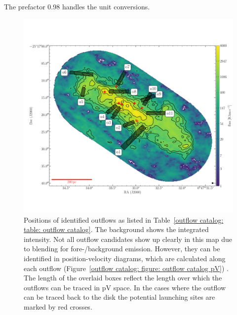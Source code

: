 The prefactor 0.98 handles the unit conversions.

\begin{figure}[t]
	\centering
	\includegraphics[width=\linewidth]{images/chapters/papers/outflow_catalog/fig7.pdf}
	\caption[Overview of identified small scale outflow candidates]{Positions of identified outflows as listed in Table~\ref{outflow catalog: table: outflow catalog}. The background shows the  integrated intensity. Not all outflow candidates show up clearly in this map due to blending for fore-/background emission. However, they can be identified in position-velocity diagrams, which are calculated along each outflow (Figure~\ref{outflow catalog: figure: outflow catalog pV}) . The length of the overlaid boxes reflect the length over which the outflows can be traced in pV space. In the cases where the outflow can be traced back to the disk the potential launching sites are marked by red crosses.}
	\label{outflow catalog: figure: outflow catalog}
\end{figure}

